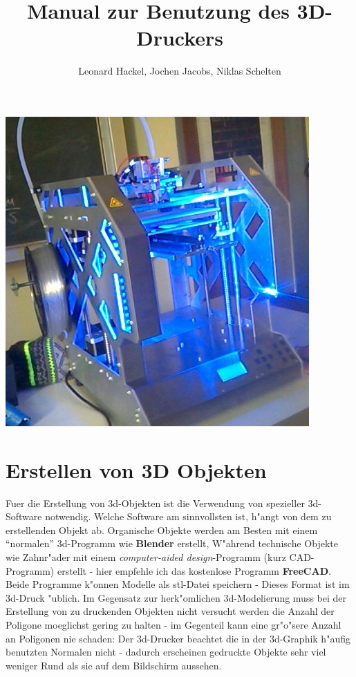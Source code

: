 \documentclass[11pt,a4paper]{scrartcl}
\author{Leonard Hackel, Jochen Jacobs, Niklas Schelten}
\title{Manual zur Benutzung des 3D-Druckers}
\begin{document}
\maketitle
\begin{center}
\includegraphics[scale=0.75]{res/31_1.jpg}
\end{center}
\pagebreak
\tableofcontents
\pagebreak
\section{Erstellen von 3D Objekten}
Fuer die Erstellung von 3d-Objekten ist die Verwendung von spezieller 3d-Software notwendig. Welche Software am sinnvollsten ist, h"angt von dem zu erstellenden Objekt ab. Organische Objekte werden am Besten mit einem \enquote{normalen} 3d-Programm wie \textbf{Blender} erstellt, W"ahrend technische Objekte wie Zahnr"ader mit einem \textit{computer-aided design}-Programm (kurz CAD-Programm) erstellt - hier empfehle ich das kostenlose Programm \textbf{FreeCAD}. Beide Programme k"onnen Modelle als stl-Datei speichern - Dieses Format ist im 3d-Druck "ublich. Im Gegensatz zur herk"omlichen 3d-Modelierung muss bei der Erstellung von zu druckenden Objekten nicht versucht werden die Anzahl der Poligone moeglichst gering zu halten - im Gegenteil kann eine gr"o"sere Anzahl an Poligonen nie schaden: Der 3d-Drucker beachtet die in der 3d-Graphik h"aufig benutzten Normalen nicht - dadurch erscheinen gedruckte Objekte sehr viel weniger Rund als sie auf dem Bildschirm aussehen.
\end{document}

